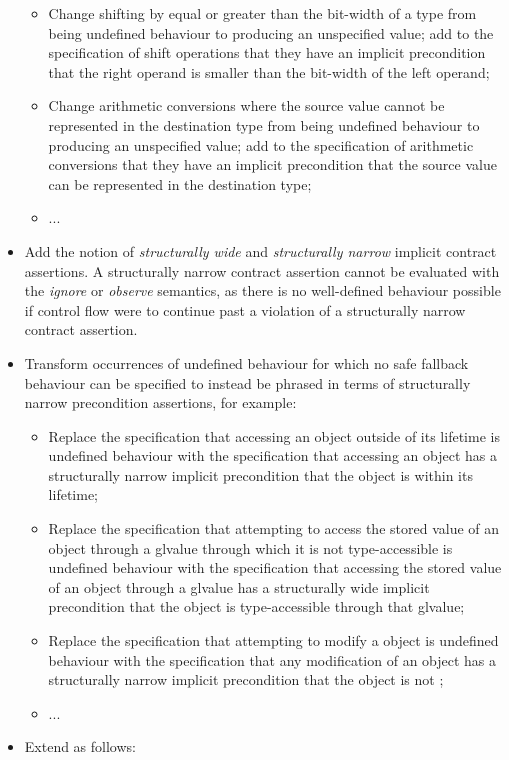 \begin{itemize}
\begin{itemize}
\item Change shifting by equal or greater than the bit-width of a type from being undefined behaviour to producing an unspecified value; add to the specification of shift operations that they have an implicit precondition that the right operand is smaller than the bit-width of the left operand;
\item Change arithmetic conversions where the source value cannot be represented in the destination type from being undefined behaviour to producing an unspecified value; add to the specification of arithmetic conversions that they have an implicit precondition that the source value can be represented in the destination type;
\item ...
\end{itemize}
\item Add the notion of \emph{structurally wide} and \emph{structurally narrow} implicit contract assertions. A structurally narrow contract assertion cannot be evaluated with the \emph{ignore} or \emph{observe} semantics, as there is no well-defined behaviour possible if control flow were to continue past a violation of a structurally narrow contract assertion.
\item Transform occurrences of undefined behaviour for which no safe fallback behaviour can be specified to instead be phrased in terms of structurally narrow precondition assertions, for example:
\begin{itemize}
\item Replace the specification that accessing an object outside of its lifetime is undefined behaviour with the specification that accessing an object has a structurally narrow implicit precondition that the object is within its lifetime;
\item Replace the specification that attempting to access the stored value of an object through a glvalue through which it is not type-accessible is undefined behaviour with the specification that accessing the stored value of an object through a glvalue has a structurally wide implicit precondition that the object is type-accessible through that glvalue;
\item Replace the specification that attempting to modify a  object is undefined behaviour with the specification that any modification of an object has a structurally narrow implicit precondition that the object is not ;
\item ...
\end{itemize}
\item Extend  as follows:


\end{itemize}
